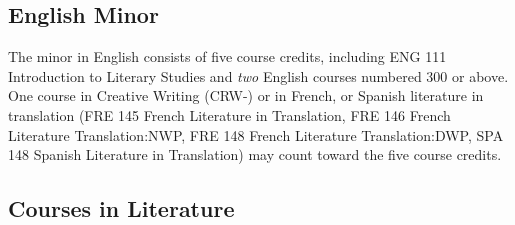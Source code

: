 \documentclass[
  letterpaper,
]{scrbook}
\begin{document}
\hypertarget{english-minor}{%
\subsection{English Minor}\label{english-minor}}

The minor in English consists of five course credits, including ENG 111
Introduction to Literary Studies and \emph{two} English courses numbered
300 or above. One course in Creative Writing (CRW-) or in French, or
Spanish literature in translation (FRE 145 French Literature in
Translation, FRE 146 French Literature Translation:NWP, FRE 148 French
Literature Translation:DWP, SPA 148 Spanish Literature in Translation)
may count toward the five course credits.

\hypertarget{courses-in-literature}{%
\subsection{Courses in Literature}\label{courses-in-literature}}
\end{document}

